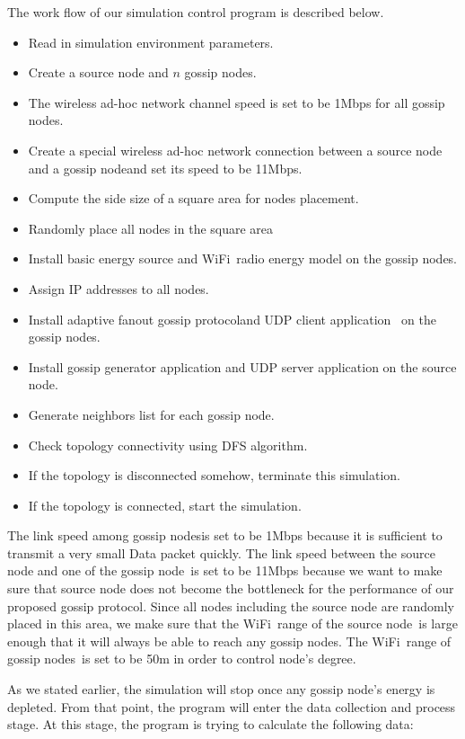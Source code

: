 \documentclass[onehalf,11pt]{beavtex}
\newcommand{\gp}{gossip protocol}
\newcommand{\gn}{gossip node}
\newcommand{\gns}{gossip nodes}
\newcommand{\wf}{WiFi}
\newcommand{\sn}{source node}
\begin{document}
The work flow of our simulation control program is described below. 

\begin{itemize}
	\item Read in simulation environment parameters. 
	\item Create a source node and $n$ gossip nodes.
	\item The wireless ad-hoc network channel speed is set to be 1Mbps for all \gns.
	\item Create a special wireless ad-hoc network connection between a source node and a \gn and set its speed to be 11Mbps.
	\item Compute the side size of a square area for nodes placement.
	\item Randomly place all nodes in the square area
	\item Install basic energy source and \wf ~radio energy model on the \gns.
	\item Assign IP addresses to all nodes.
	\item Install adaptive fanout \gp and UDP client application ~on the \gns.
	\item Install gossip generator application and UDP server application on the \sn.
	\item Generate neighbors list for each \gn.
	\item Check topology connectivity using DFS algorithm.
	\item If the topology is disconnected somehow, terminate this simulation.
	\item If the topology is connected, start the simulation.
\end{itemize}

The link speed among \gns is set to be 1Mbps because it is sufficient to transmit a very small Data packet quickly. The link speed between the source node and one of the \gn ~is set to be 11Mbps because we want to make sure that source node does not become the bottleneck for the performance of our proposed \gp. Since all nodes including the source node are randomly placed in this area, we make sure that the \wf ~range of the \sn ~is large enough that it will always be able to reach any \gns. The \wf ~range of \gns ~is set to be 50m in order to control node's degree. 

As we stated earlier, the simulation will stop once any \gn's energy is depleted. From that point, the program will enter the data collection and process stage. At this stage, the program is trying to calculate the following data:
\end{document}
